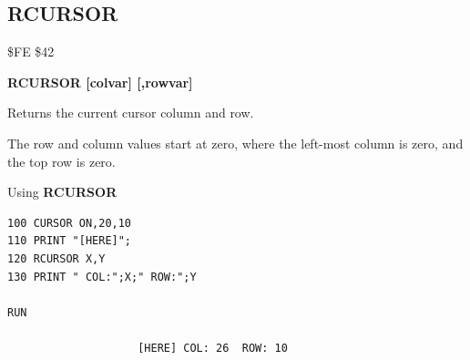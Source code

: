 \subsection{RCURSOR}
\begin{description}[leftmargin=2cm,style=nextline]
\item [Token:] \$FE \$42
\item [Format:] {\bf RCURSOR [colvar] [,rowvar]}
\item [Usage:]  Returns the current cursor column and row.

\item [Remarks:] The row and column values start at zero, where
                 the left-most column is zero, and the top row is zero.

\item [Example:] Using {\bf RCURSOR}

\begin{tcolorbox}[colback=black,coltext=white]
\verbatimfont{\codefont}
\begin{verbatim}
100 CURSOR ON,20,10
110 PRINT "[HERE]";
120 RCURSOR X,Y
130 PRINT " COL:";X;" ROW:";Y

RUN

                    [HERE] COL: 26  ROW: 10
\end{verbatim}
\end{tcolorbox}
\end{description}


\newpage
